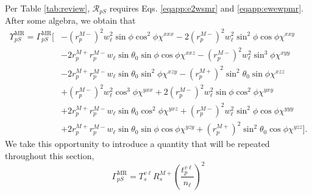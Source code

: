 Per Table \ref{tab:review}, $\mathcal{R}_{pS}$ requires Eqs. \eqref{eqapp:e2wsmr}
and \eqref{eqapp:ewewpmr}. After some algebra, we obtain that
\begin{equation}\label{eqapp:rpsfullmr}
\begin{split}
\Upsilon^{\mathrm{MR}}_{pS}
= 
\Gamma^{\mathrm{MR}}_{pS}
\big[
&- \left(r^{M-}_{p}\right)^{2}w^{2}_{\ell}\sin\phi\cos^{2}\phi\chi^{xxx}
 - 2\left(r^{M-}_{p}\right)^{2}w^{2}_{\ell}\sin^{2}\phi\cos\phi\chi^{xxy}\\
&- 2r^{M+}_{p}r^{M-}_{p}w_{\ell}\sin\theta_{0}\sin\phi\cos\phi\chi^{xxz}
 - \left(r^{M-}_{p}\right)^{2}w^{2}_{\ell}\sin^{3}\phi\chi^{xyy}\\
&- 2r^{M+}_{p}r^{M-}_{p}w_{\ell}\sin\theta_{0}\sin^{2}\phi\chi^{xzy}
 - \left(r^{M+}_{p}\right)^{2}\sin^{2}\theta_{0}\sin\phi\chi^{xzz}\\
&+ \left(r^{M-}_{p}\right)^{2}w^{2}_{\ell}\cos^{3}\phi\chi^{yxx}
 + 2\left(r^{M-}_{p}\right)^{2}w^{2}_{\ell}\sin\phi\cos^{2}\phi\chi^{yxy}\\
&+ 2r^{M+}_{p}r^{M-}_{p}w_{\ell}\sin\theta_{0}\cos^{2}\phi\chi^{yxz}
 + \left(r^{M-}_{p}\right)^{2}w^{2}_{\ell}\sin^{2}\phi\cos\phi\chi^{yyy}\\
&+ 2r^{M+}_{p}r^{M-}_{p}w_{\ell}\sin\theta_{0}\sin\phi\cos\phi\chi^{yzy}
 + \left(r^{M+}_{p}\right)^{2}\sin^{2}\theta_{0}\cos\phi\chi^{yzz}
\big].
\end{split}
\end{equation}
We take this opportunity to introduce a quantity that will be repeated
throughout this section,
\begin{equation}\label{eqapp:gammapsmr}
\Gamma^{\mathrm{MR}}_{pS} =
T_{s}^{v\ell}R^{M+}_{s}
\left(\frac{t^{v\ell}_{p}}{n_{\ell}}\right)^{2}
\end{equation}

